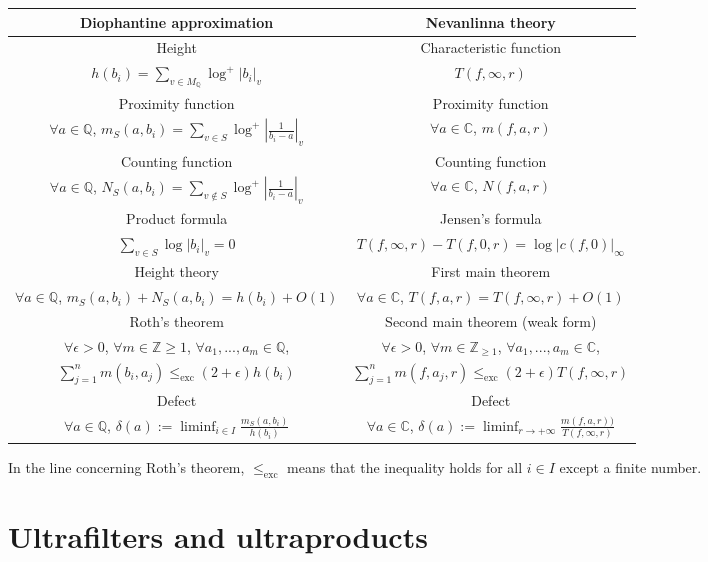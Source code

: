 \documentclass [11pt,reqno]{amsart}
\def\bC{{\mathbb{C}}}
\def\bQ{{\mathbb{Q}}}
\def\bZ{{\mathbb{Z}}}
\newcommand{\1}{\mathmybb{1}}
\def\exc{\operatorname{exc}}
\begin{document}
\begin{center}
  \begin{tabular}{|c|c|}
  \hline  
  Diophantine approximation & Nevanlinna theory \\
  \hline
  Height  & Characteristic function \\ 
   $h(b_i) = \sum_{v\in M_{\bQ}} \log^{+}|b_i|_v$ & $T(f,\infty,r)$\\
  \hline
  Proximity function  & Proximity function \\ 
  $\forall a\in \bQ$, $m_{S}(a,b_i) =   \sum_{v\in S}\log^{+}|\frac{1}{b_i-a}|_v$ & $\forall a\in \bC$, $m(f,a,r)$\\
  \hline
  Counting function  & Counting function \\ 
  $\forall a\in \bQ$, $N_{S}(a,b_i) =   \sum_{v\notin S}\log^{+}|\frac{1}{b_i-a}|_v$ & $\forall a\in \bC$, $N(f,a,r)$\\
  \hline
  Product formula & Jensen's formula \\ 
  $\sum_{v\in S}\log|b_i|_v=0$ & $T(f,\infty,r) - T(f,0,r) = \log|c(f,0)|_{\infty}$\\
  \hline
  Height theory & First main theorem \\ 
  $\forall a\in \bQ$, $m_S(a,b_i)+N_{S}(a,b_i)= h(b_i) + O(1)$ & $\forall a\in\bC$, $T(f,a,r) = T(f,\infty,r) + O(1)$\\
  \hline
  Roth's theorem & Second main theorem (weak form) \\ 
  $\forall \epsilon>0$,  $\forall m\in\bZ{\geq 1}$, $\forall a_1,...,a_m\in \bQ$, & $\forall \epsilon>0$, $\forall m\in\bZ_{\geq 1}$, $\forall a_1,...,a_m\in\bC$,\\
 $\sum_{j=1}^n m(b_i,a_j) \leq_{\exc} (2+\epsilon)h(b_i)$ & $\sum_{j=1}^n m(f,a_j,r) \leq_{\text{exc}} (2+\epsilon)T(f,\infty,r)$\\
  \hline
  Defect & Defect \\ 
  $\forall a\in \bQ$, $\delta(a):= \liminf_{i\in I} \frac{m_{S}(a,b_i)}{h(b_i)}$ & $\forall a\in \bC$, $\delta(a):= \liminf_{r\to +\infty} \frac{m(f,a,r))}{T(f,\infty,r)}$\\
  \hline
\end{tabular}
\end{center}
In the line concerning Roth's theorem, $\leq_{\text{exc}}$ means that the inequality holds for all $i\in I$ except a finite number.

\section{Ultrafilters and ultraproducts}
\label{sec:ultrafilters}
\end{document}
